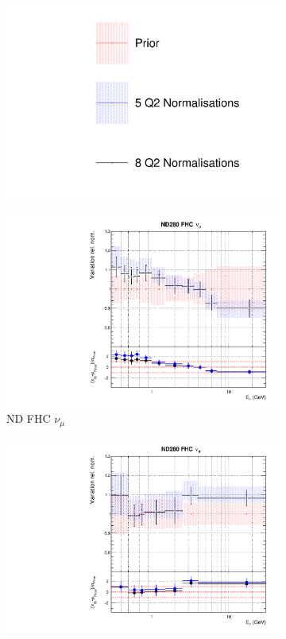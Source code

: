 \begin{figure}
\centering
\begin{subfigure}{0.95\textwidth}
  \centering
  \includegraphics[width=0.24\linewidth]{figs/comp5q2vs8q2_leg}
\end{subfigure}
\begin{subfigure}{0.24\textwidth}
  \centering
  \includegraphics[width=0.95\linewidth]{figs/comp5q2vs8q2flux0}
  \caption{ND FHC $\nu_{\mu}$}
\end{subfigure}
\begin{subfigure}{0.24\textwidth}
  \centering
  \includegraphics[width=0.95\linewidth]{figs/comp5q2vs8q2flux1}

\end{subfigure}
\end{figure}
